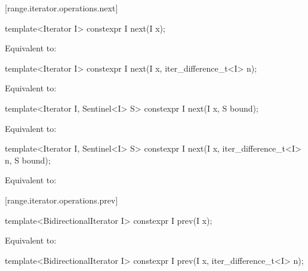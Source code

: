 \begin{addedblock}
[range.iterator.operations.next]{}
%
\begin{itemdecl}
template<Iterator I>
  constexpr I next(I x);
\end{itemdecl}

\begin{itemdescr}
\pnum
\effects Equivalent to: 
\end{itemdescr}

%
\begin{itemdecl}
template<Iterator I>
  constexpr I next(I x, iter_difference_t<I> n);
\end{itemdecl}

\begin{itemdescr}
\pnum
\effects Equivalent to: 
\end{itemdescr}

%
\begin{itemdecl}
template<Iterator I, Sentinel<I> S>
  constexpr I next(I x, S bound);
\end{itemdecl}

\begin{itemdescr}
\pnum
\effects Equivalent to: 
\end{itemdescr}

%
\begin{itemdecl}
template<Iterator I, Sentinel<I> S>
  constexpr I next(I x, iter_difference_t<I> n, S bound);
\end{itemdecl}

\begin{itemdescr}
\pnum
\effects Equivalent to: 
\end{itemdescr}

[range.iterator.operations.prev]{}
%
\begin{itemdecl}
template<BidirectionalIterator I>
  constexpr I prev(I x);
\end{itemdecl}

\begin{itemdescr}
\pnum
\effects Equivalent to: 
\end{itemdescr}

%
\begin{itemdecl}
template<BidirectionalIterator I>
  constexpr I prev(I x, iter_difference_t<I> n);
\end{itemdecl}


\end{addedblock}
